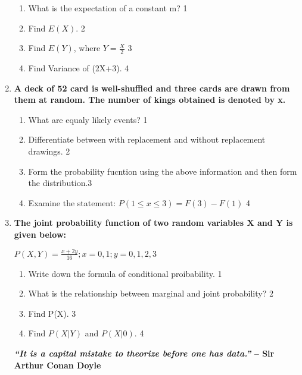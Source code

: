 \documentclass{article}
\begin{document}
\begin{enumerate}
  \begin{enumerate}
    \item
	What is the expectation of a constant m? \hfill 1
    \item
	Find $E(X).$ \hfill 2
    \item  
	Find $E(Y)$, where $Y = \frac X2$  \hfill 3
    \item
	Find Variance of (2X+3). \hfill 4
  \end{enumerate}

  
 \item
	  \textbf{A deck of 52 card is well-shuffled and three cards are drawn from them at random. The number of kings obtained is denoted by x.} 
  
  \begin{enumerate}
    \item
	What are equaly likely events? \hfill 1
    \item
	Differentiate between with replacement and without replacement drawings. \hfill 2
    \item  
	Form the probability fucntion using the above information and then form the distribution.\hfill 3
    \item
	Examine the statement: $P(1 \le x \le 3) = F(3)-F(1)$ \hfill 4
  \end{enumerate}
  
     \item
  \textbf{The joint probability function of two random variables X and Y is given below:}
  
  \begin{center}
  $\displaystyle P(X,Y) = \frac {x+2y}{16}; x = 0, 1; y = 0 ,1,2,3$
  \end{center}
 
  \begin{enumerate}
    \item
	Write down the formula of conditional proibability. \hfill 1
    \item
    	What is the relationship between marginal and joint probability? \hfill 2
    \item
    	Find P(X). \hfill 3
     \item
     	Find $P(X\vert Y)$ and $P(X\vert 0)$. \hfill 4
  \end{enumerate}

 \vspace{2.5cm}
 
\begin{center}
\textbf{\textit{“It is a capital mistake to theorize before one has data.”} – Sir Arthur Conan Doyle}
\end{center}
  
\end{enumerate}
\end{document}
